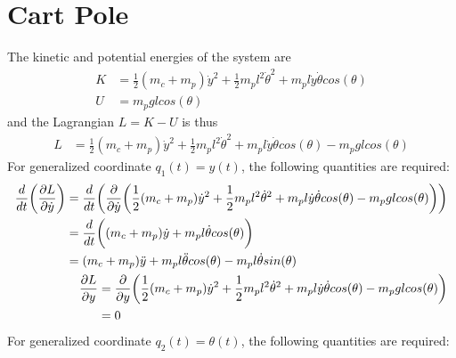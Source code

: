 \section{Cart Pole}
\label{appendix:modeling:cartpole}
The kinetic and potential energies of the system are
\begin{subequations}
\begin{align}
	K &= \frac{1}{2}(m_{c} + m_{p})\dot{y}^{2} + \frac{1}{2}m_{p}l^{2}\dot{\theta}^{2} + m_{p}l\dot{y}\dot{\theta}cos(\theta)\\
	U &= m_{p}glcos(\theta)
\end{align}
\end{subequations}
and the Lagrangian $L = K - U$ is thus
\begin{equation}
\begin{aligned}
	L &= \frac{1}{2}(m_{c} + m_{p})\dot{y}^{2} + \frac{1}{2}m_{p}l^{2}\dot{\theta}^{2}
		+ m_{p}l\dot{y}\dot{\theta}cos(\theta) -  m_{p}glcos(\theta)
\end{aligned}
\end{equation}
For generalized coordinate $q_{1}(t) = y(t)$, the following quantities are required:
\begin{subequations}
\begin{align}
\begin{split}
	\frac{d}{dt} \bigg{(} \frac{\partial L}{\partial \dot{y}} \bigg{)}
	&= \frac{d}{dt} \bigg{(} \frac{\partial}{\partial \dot{y}} \bigg{(}
	\frac{1}{2}(m_{c} + m_{p})\dot{y}^{2} + \frac{1}{2}m_{p}l^{2}\dot{\theta}^{2}
		+ m_{p}l\dot{y}\dot{\theta}cos(\theta) -  m_{p}glcos(\theta)
	\bigg{)} \bigg{)}
	\\
	&= \frac{d}{dt} \bigg{(}
	(m_{c} + m_{p})\dot{y} + m_{p}l\dot{\theta}cos(\theta)
	\bigg{)}
	\\
	&= (m_{c} + m_{p})\ddot{y} + m_{p}l\ddot{\theta}cos(\theta) - m_{p}l\dot{\theta}sin(\theta)
\end{split}
	\\
\begin{split}
	\frac{\partial L}{\partial y}
	&= \frac{\partial}{\partial y} \bigg{(}
	\frac{1}{2}(m_{c} + m_{p})\dot{y}^{2} + \frac{1}{2}m_{p}l^{2}\dot{\theta}^{2}
		+ m_{p}l\dot{y}\dot{\theta}cos(\theta) - m_{p}glcos(\theta)
	\bigg{)}
	\\
	&= 0
\end{split}
\end{align}
\end{subequations}
For generalized coordinate $q_{2}(t) = \theta(t)$, the following quantities are required:
